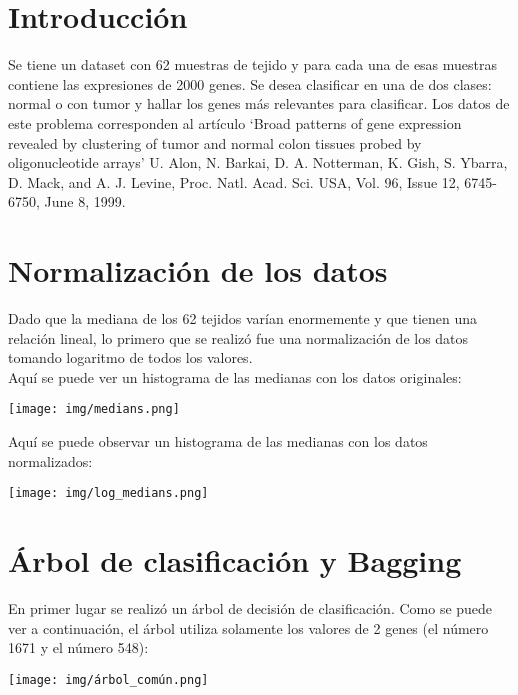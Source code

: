 \documentclass{article}
\begin{document}
\section{Introducción}
Se tiene un dataset con 62 muestras de tejido y para cada una de esas muestras contiene las expresiones de 2000 genes. Se desea clasificar en una de dos clases: normal o con tumor y hallar los genes más relevantes para clasificar. Los datos de este problema corresponden al artículo ‘Broad patterns of gene expression revealed by clustering of tumor and normal colon tissues probed by oligonucleotide arrays’ U. Alon, N. Barkai, D. A. Notterman, K. Gish, S. Ybarra, D. Mack, and A. J. Levine, Proc. Natl. Acad. Sci. USA, Vol. 96, Issue 12, 6745-6750, June 8, 1999.


\section{Normalización de los datos}
Dado que la mediana de los 62 tejidos varían enormemente y que tienen una relación lineal, lo primero que se realizó fue una normalización de los datos tomando logaritmo de todos los valores.\\

\noindent
Aquí se puede ver un histograma de las medianas con los datos originales:\\

\begin{center}
    \texttt{[image: img/medians.png]}
\end{center}

\noindent
Aquí se puede observar un histograma de las medianas con los datos normalizados:\\

\begin{center}
    \texttt{[image: img/log\_medians.png]}
\end{center}


\section{Árbol de clasificación y Bagging}
En primer lugar se realizó un árbol de decisión de clasificación. Como se puede ver a continuación, el árbol utiliza solamente los valores de 2 genes (el número 1671 y el número 548):\\

\begin{center}
    \texttt{[image: img/árbol\_común.png]}
\end{center}
\end{document}
